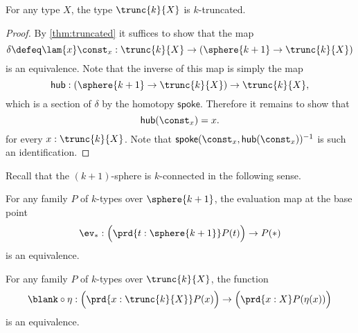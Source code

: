 \begin{prp}
  For any type $X$, the type $\trunc{k}{X}$ is $k$-truncated.
\end{prp}

\begin{proof}
  By \cref{thm:truncated} it suffices to show that the map
  \begin{equation*}
    \delta\defeq\lam{x}\const_x:\trunc{k}{X}\to (\sphere{k+1}\to\trunc{k}{X})
  \end{equation*}
  is an equivalence. Note that the inverse of this map is simply the map
  \begin{equation*}
    \mathsf{hub}: (\sphere{k+1}\to\trunc{k}{X})\to \trunc{k}{X},
  \end{equation*}
  which is a section of $\delta$ by the homotopy $\mathsf{spoke}$. Therefore it remains to show that
  \begin{equation*}
    \mathsf{hub}(\const_x)=x.
  \end{equation*}
  for every $x:\trunc{k}{X}$. Note that $\mathsf{spoke}(\const_x,\mathsf{hub}(\const_x))^{-1}$ is such an identification.
\end{proof}

Recall that the $(k+1)$-sphere is $k$-connected in the following sense.

\begin{lem}\label{lem:sphere-connected}
  For any family $P$ of $k$-types over $\sphere{k+1}$, the evaluation map at the base point
  \begin{equation*}
    \ev_\ast : \Big(\prd{t:\sphere{k+1}}P(t)\Big)\to P(\ast)
  \end{equation*}
  is an equivalence.
\end{lem}

\begin{thm}
  For any family $P$ of $k$-types over $\trunc{k}{X}$, the function
  \begin{equation*}
    \blank\circ\eta:\Big(\prd{x:\trunc{k}{X}}P(x)\Big)\to\Big(\prd{x:X}P(\eta(x))\Big)
  \end{equation*}
  is an equivalence.
\end{thm}

